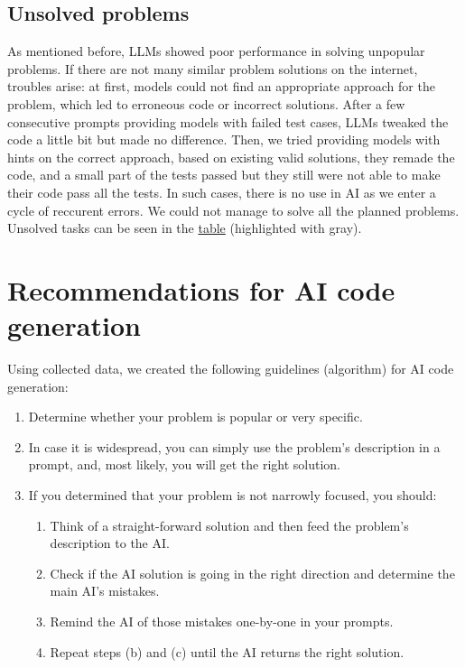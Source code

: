 \documentclass[12pt]{report}
\begin{document}
	\subsection{Unsolved problems}
		\qquad As mentioned before, LLMs showed poor performance in solving unpopular problems. If there are not many similar problem solutions on the internet, troubles arise: at first, models could not find an appropriate approach for the problem, which led to erroneous code or incorrect solutions. After a few consecutive prompts providing models with failed test cases, LLMs tweaked the code a little bit but made no difference. Then, we tried providing models with hints on the correct approach, based on existing valid solutions, they remade the code, and a small part of the tests passed but they still were not able to make their code pass all the tests. In such cases, there is no use in AI as we enter a cycle of reccurent errors. We could not manage to solve all the planned problems. Unsolved tasks can be seen in the \href{https://docs.google.com/spreadsheets/d/1qXPyAJsOOpmtxIoGqObwG5mTaLU3IWO0SQRGbjZPhEc/edit#gid=0}{table} (highlighted with gray).

	\section{Recommendations for AI code generation}
		\qquad Using collected data, we created the following guidelines (algorithm) for AI code generation:

		\begin{enumerate}
			\item Determine whether your problem is popular or very specific.
			\item In case it is widespread, you can simply use the problem's description in a prompt, and, most likely, you will get the right solution.
			\item If you determined that your problem is not narrowly focused, you should:
			\begin{enumerate}
				\item Think of a straight-forward solution and then feed the problem's description to the AI.
				\item Check if the AI solution is going in the right direction and determine the main AI's mistakes.
				\item Remind the AI of those mistakes one-by-one in your prompts.
				\item Repeat steps (b) and (c) until the AI returns the right solution.
			\end{enumerate}
		\end{enumerate}
\end{document}
